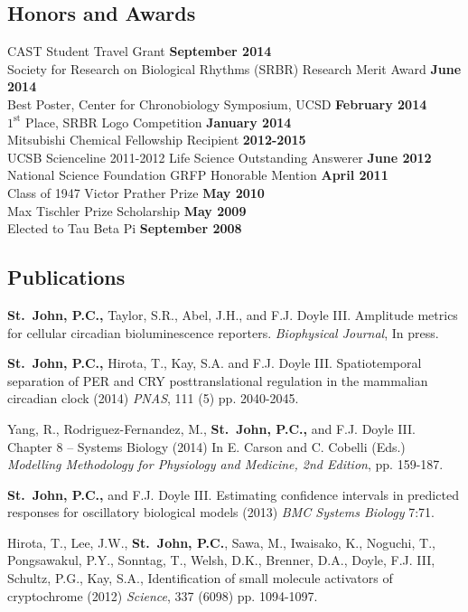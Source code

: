 {\subsection*{Honors and Awards} 
CAST Student Travel Grant \hfill {\bfseries September 2014}\\
Society for Research on Biological Rhythms (SRBR) Research Merit Award \hfill {\bf June 2014}\\
Best Poster, Center for Chronobiology Symposium, UCSD \hfill {\bf February 2014} \\
$1^\textrm{st}$ Place, SRBR Logo Competition \hfill {\bf January 2014} \\
Mitsubishi Chemical Fellowship Recipient \hfill {\bf 2012-2015} \\
UCSB Scienceline 2011-2012 Life Science Outstanding Answerer \hfill {\bf June 2012} \\
National Science Foundation GRFP Honorable Mention \hfill {\bf April 2011} \\
Class of 1947 Victor Prather Prize \hfill {\bf May 2010}\\
Max Tischler Prize Scholarship \hfill  {\bf May 2009}\\
Elected to Tau Beta Pi \hfill  {\bf September 2008}\\

\subsection*{Publications}
{\bfseries St.\ John, P.C.,} Taylor, S.R., Abel, J.H., and F.J. Doyle III.
Amplitude metrics for cellular circadian bioluminescence reporters. {\itshape Biophysical Journal}, In press.

{\bfseries St.\ John, P.C.,} Hirota, T., Kay, S.A. and F.J. Doyle III.
Spatiotemporal separation of PER and CRY posttranslational regulation in the
mammalian circadian clock (2014) {\itshape PNAS}, 111 (5) pp. 2040-2045.

Yang, R., Rodriguez-Fernandez, M., {\bfseries St.\ John, P.C.,} and F.J. Doyle III. Chapter 8 -- Systems Biology (2014) In E. Carson and C. Cobelli (Eds.)
{\itshape Modelling Methodology for Physiology and Medicine, 2nd Edition}, pp.
159-187.

{\bfseries St.\ John, P.C.,} and F.J. Doyle III. Estimating confidence intervals in predicted responses for oscillatory biological models (2013) {\itshape BMC Systems Biology} 7:71.
 
Hirota, T., Lee, J.W., {\bfseries St.\ John, P.C.}, Sawa, M., Iwaisako, K.,
Noguchi, T., Pongsawakul, P.Y., Sonntag, T., Welsh, D.K., Brenner, D.A., Doyle,
F.J. III, Schultz, P.G., Kay, S.A.,  Identification of small molecule
activators of cryptochrome (2012) {\itshape Science}, 337 (6098) pp. 1094-1097.

}

